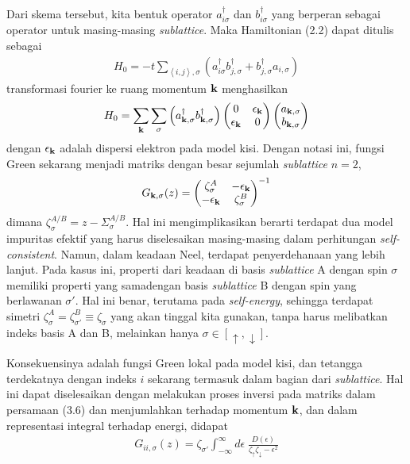 Dari skema tersebut, kita bentuk operator $a^\dagger_{i\sigma}$ dan $b^\dagger_{i\sigma}$ yang berperan sebagai operator untuk masing-masing \textit{sublattice}. Maka Hamiltonian (2.2) dapat ditulis sebagai
\begin{align}
H_0 = - t \sum_{\left< i,j \right>,\sigma} \left( a^\dagger_{i\sigma} b^\dagger_{j,\sigma} + b^\dagger_{j,\sigma}a_{i,\sigma} \right)
\end{align}
transformasi fourier ke ruang momentum $\textbf{k}$ menghasilkan
\begin{align}
H_0 = \sum_{\textbf{k}} \sum_\sigma \left( a^\dagger_{\textbf{k},\sigma} b^\dagger_{\textbf{k},\sigma}  \right)
\begin{pmatrix}
0 & \epsilon_{\textbf{k}} \\
\epsilon_{\textbf{k}} & 0
\end{pmatrix}
\begin{pmatrix}
a_{\textbf{k},\sigma} \\
b_{\textbf{k},\sigma}
\end{pmatrix}
\end{align}
dengan $\epsilon_{\textbf{k}}$ adalah dispersi elektron pada model kisi. Dengan notasi ini, fungsi Green sekarang menjadi matriks dengan besar sejumlah \textit{sublattice} $n = 2$,
\begin{align}
G_{\textbf{k},\sigma}(z) = 
\begin{pmatrix}
\zeta^A_\sigma & -\epsilon_{\textbf{k}} \\
-\epsilon_{\textbf{k}} & \zeta^B_\sigma
\end{pmatrix}^{-1}
\end{align} 
dimana $\zeta^{A/B}_\sigma = z - \Sigma^{A/B}_\sigma$. Hal ini mengimplikasikan berarti terdapat dua model impuritas efektif yang harus diselesaikan masing-masing dalam perhitungan \textit{self-consistent}. Namun, dalam keadaan Neel, terdapat penyerdehanaan yang lebih lanjut. Pada kasus ini, properti dari keadaan di basis \textit{sublattice} A dengan spin $\sigma$ memiliki properti yang samadengan basis \textit{sublattice} B dengan spin yang berlawanan $\sigma'$. Hal ini benar, terutama pada \textit{self-energy}, sehingga terdapat simetri $\zeta^A_\sigma = \zeta^B_{\sigma'} \equiv \zeta_\sigma$ yang akan tinggal kita gunakan, tanpa harus melibatkan indeks basis A dan B, melainkan hanya $\sigma \in [\uparrow, \downarrow]$.

Konsekuensinya adalah fungsi Green lokal pada model kisi, dan tetangga terdekatnya dengan indeks $i$ sekarang termasuk dalam bagian dari \textit{sublattice}. Hal ini dapat diselesaikan dengan melakukan proses inversi pada matriks dalam persamaan (3.6) dan menjumlahkan terhadap momentum $\textbf{k}$, dan dalam representasi integral terhadap energi, didapat\cite{DMFT}
\begin{align}
G_{ii,\sigma}(z) = \zeta_{\sigma'} \int_{-\infty}^\infty d\epsilon \; \frac{D(\epsilon)}{\zeta_\uparrow \zeta_\downarrow - \epsilon^2}
\end{align}

